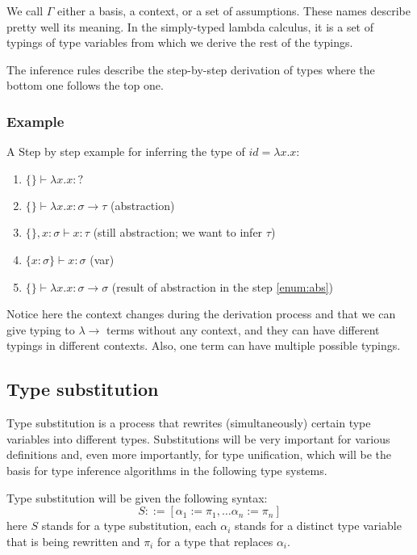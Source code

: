 We call $\Gamma$ either a basis, a context, or a set of assumptions. These names describe pretty well its meaning. In the simply-typed lambda calculus, it is a set of typings of type variables from which we derive the rest of the typings.

The inference rules describe the step-by-step derivation of types where the bottom one follows the top one.

\subsubsection{Example}
\label{sssec:idExample}
A Step by step example for inferring the type of $id = \lambda x . x$:

\begin{enumerate}
    \item $\{\} \vdash \lambda x . x : ?$
    \item $\{\} \vdash \lambda x . x : \sigma \rightarrow \tau$ (abstraction) \label{enum:abs}
    \item $\{\}, x : \sigma \vdash x : \tau$ (still abstraction; we want to infer $\tau$)
    \item $\{x : \sigma\} \vdash x : \sigma$ (var)
    \item $\{\} \vdash \lambda x . x : \sigma \rightarrow \sigma$ (result of abstraction in the step \ref{enum:abs})
\end{enumerate}

Notice here the context changes during the derivation process and that we can give typing to $\lambda\rightarrow$ terms without any context, and they can have different typings in different contexts. Also, one term can have multiple possible typings.


\subsection{Type substitution}

\begin{defn}
    \label{defn:substitution}
    Type substitution is a process that rewrites (simultaneously) certain type variables into different types. Substitutions will be very important for various definitions and, even more importantly, for type unification, which will be the basis for type inference algorithms in the following type systems.

    Type substitution will be given the following syntax:
    $$S ::= [\alpha_1 := \pi_1, \dots \alpha_n := \pi_n]$$
    here $S$ stands for a type substitution, each $\alpha_i$ stands for a distinct type variable that is being rewritten and $\pi_i$ for a type that replaces $\alpha_i$.
\end{defn}

